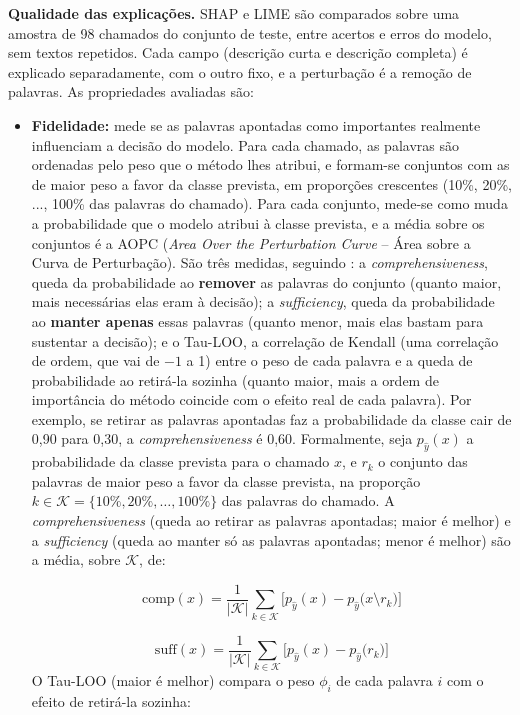 \documentclass[
    12pt,                %
    openright,           %
    oneside,             %
    a4paper,             %
    english,             %
    brazil               %
]{abntex2}
\begin{document}
\textbf{Qualidade das explicações.} SHAP e LIME são comparados sobre uma amostra de 98 chamados do conjunto de teste, entre acertos e erros do modelo, sem textos repetidos. Cada campo (descrição curta e descrição completa) é explicado separadamente, com o outro fixo, e a perturbação é a remoção de palavras. As propriedades avaliadas são:
\begin{itemize}
  \item \textbf{Fidelidade:} mede se as palavras apontadas como importantes realmente influenciam a decisão do modelo. Para cada chamado, as palavras são ordenadas pelo peso que o método lhes atribui, e formam-se conjuntos com as de maior peso a favor da classe prevista, em proporções crescentes (10\%, 20\%, ..., 100\% das palavras do chamado). Para cada conjunto, mede-se como muda a probabilidade que o modelo atribui à classe prevista, e a média sobre os conjuntos é a AOPC (\textit{Area Over the Perturbation Curve} -- Área sobre a Curva de Perturbação). São três medidas, seguindo : a \textit{comprehensiveness}, queda da probabilidade ao \textbf{remover} as palavras do conjunto (quanto maior, mais necessárias elas eram à decisão); a \textit{sufficiency}, queda da probabilidade ao \textbf{manter apenas} essas palavras (quanto menor, mais elas bastam para sustentar a decisão); e o Tau-LOO, a correlação de Kendall (uma correlação de ordem, que vai de $-1$ a 1) entre o peso de cada palavra e a queda de probabilidade ao retirá-la sozinha (quanto maior, mais a ordem de importância do método coincide com o efeito real de cada palavra). Por exemplo, se retirar as palavras apontadas faz a probabilidade da classe cair de 0,90 para 0,30, a \textit{comprehensiveness} é 0,60. Formalmente, seja $p_{\hat y}(x)$ a probabilidade da classe prevista para o chamado $x$, e $r_k$ o conjunto das palavras de maior peso a favor da classe prevista, na proporção $k \in \mathcal{K} = \{10\%, 20\%, \dots, 100\%\}$ das palavras do chamado. A \textit{comprehensiveness} (queda ao retirar as palavras apontadas; maior é melhor) e a \textit{sufficiency} (queda ao manter só as palavras apontadas; menor é melhor) são a média, sobre $\mathcal{K}$, de:

\begin{equation}
\mathrm{comp}(x) = \frac{1}{|\mathcal{K}|} \sum_{k \in \mathcal{K}}
\Big[ p_{\hat y}(x) - p_{\hat y}\big(x \setminus r_k\big) \Big]
\label{eq:comp}
\end{equation}

\begin{equation}
\mathrm{suff}(x) = \frac{1}{|\mathcal{K}|} \sum_{k \in \mathcal{K}}
\Big[ p_{\hat y}(x) - p_{\hat y}\big(r_k\big) \Big]
\label{eq:suff}
\end{equation}
O Tau-LOO (maior é melhor) compara o peso $\phi_i$ de cada palavra $i$ com o efeito de retirá-la sozinha:


\end{itemize}
\end{document}
